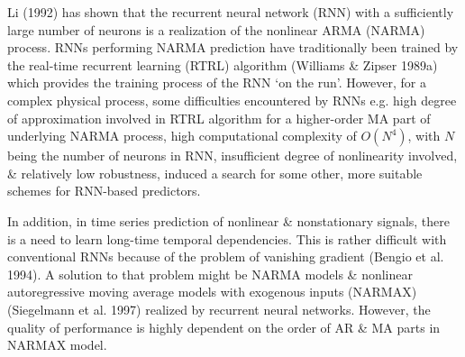 \documentclass{article}
\begin{document}
\begin{enumerate}
\begin{itemize}
\begin{itemize}
			Li (1992) has shown that the recurrent neural network (RNN) with a sufficiently large number of neurons is a realization of the nonlinear ARMA (NARMA) process. RNNs performing NARMA prediction have traditionally been trained by the real-time recurrent learning (RTRL) algorithm (Williams \& Zipser 1989a) which provides the training process of the RNN `on the run'. However, for a complex physical process, some difficulties encountered by RNNs e.g. high degree of approximation involved in RTRL algorithm for a higher-order MA part of underlying NARMA process, high computational complexity of $O(N^4)$, with $N$ being the number of neurons in RNN, insufficient degree of nonlinearity involved, \& relatively low robustness, induced a search for some other, more suitable schemes for RNN-based predictors.
			
			In addition, in time series prediction of nonlinear \& nonstationary signals, there is a need to learn long-time temporal dependencies. This is rather difficult with conventional RNNs because of the problem of vanishing gradient (Bengio et al. 1994). A solution to that problem might be NARMA models \& nonlinear autoregressive moving average models with exogenous inputs (NARMAX) (Siegelmann et al. 1997) realized by recurrent neural networks. However, the quality of performance is highly dependent on the order of AR \& MA parts in NARMAX model.
			

\end{itemize}
\end{itemize}
\end{enumerate}
\end{document}
